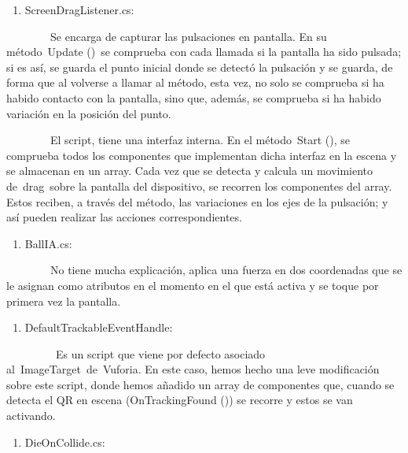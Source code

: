 \begin{enumerate}
\def\labelenumi{\arabic{enumi}.}
\itemsep1pt\parskip0pt
\item
  ScreenDragListener.cs:
\end{enumerate}

~~~~~~~~Se encarga de capturar las pulsaciones en pantalla. En su
método~Update ()~se comprueba con cada llamada si la pantalla ha sido
pulsada; si es así, se guarda el punto inicial donde se detectó la
pulsación y se guarda, de forma que al volverse a llamar al método, esta
vez, no solo se comprueba si ha habido contacto con la pantalla, sino
que, además, se comprueba si ha habido variación en la posición del
punto.

~~~~~~~~El script, tiene una interfaz interna. En el método~Start (), se
comprueba todos los componentes que implementan dicha interfaz en la
escena y se almacenan en un array. Cada vez que se detecta y calcula un
movimiento de~drag~sobre la pantalla del dispositivo, se recorren los
componentes del array. Estos reciben, a través del método, las
variaciones en los ejes de la pulsación; y así pueden realizar las
acciones correspondientes.

\begin{enumerate}
\def\labelenumi{\arabic{enumi}.}
\setcounter{enumi}{1}
\itemsep1pt\parskip0pt
\item
  BallIA.cs:
\end{enumerate}

~~~~~~~~No tiene mucha explicación, aplica una fuerza en dos coordenadas
que se le asignan como atributos en el momento en el que está activa y
se toque por primera vez la pantalla.

\begin{enumerate}
\def\labelenumi{\arabic{enumi}.}
\setcounter{enumi}{2}
\itemsep1pt\parskip0pt
\item
  DefaultTrackableEventHandle:
\end{enumerate}

~~~~~~~~~Es un script que viene por defecto asociado
al~ImageTarget~de~Vuforia. En este caso, hemos hecho una leve
modificación sobre este script, donde hemos añadido un array de
componentes que, cuando se detecta el QR en escena (OnTrackingFound ())
se recorre y estos se van activando.

\begin{enumerate}
\def\labelenumi{\arabic{enumi}.}
\setcounter{enumi}{3}
\itemsep1pt\parskip0pt
\item
  DieOnCollide.cs:
\end{enumerate}

